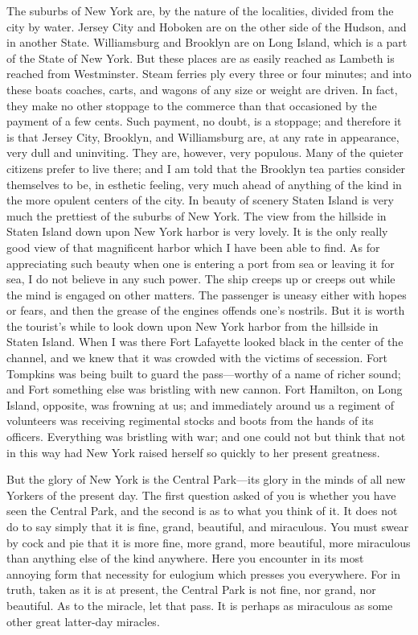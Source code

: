 The suburbs of New York are, by the nature of the localities,
divided from the city by water.  Jersey City and Hoboken are on the
other side of the Hudson, and in another State.  Williamsburg and
Brooklyn are on Long Island, which is a part of the State of New
York.  But these places are as easily reached as Lambeth is reached
from Westminster.  Steam ferries ply every three or four minutes;
and into these boats coaches, carts, and wagons of any size or
weight are driven.  In fact, they make no other stoppage to the
commerce than that occasioned by the payment of a few cents.  Such
payment, no doubt, is a stoppage; and therefore it is that Jersey
City, Brooklyn, and Williamsburg are, at any rate in appearance,
very dull and uninviting.  They are, however, very populous.  Many
of the quieter citizens prefer to live there; and I am told that
the Brooklyn tea parties consider themselves to be, in esthetic
feeling, very much ahead of anything of the kind in the more
opulent centers of the city.  In beauty of scenery Staten Island is
very much the prettiest of the suburbs of New York.  The view from
the hillside in Staten Island down upon New York harbor is very
lovely.  It is the only really good view of that magnificent harbor
which I have been able to find.  As for appreciating such beauty
when one is entering a port from sea or leaving it for sea, I do
not believe in any such power.  The ship creeps up or creeps out
while the mind is engaged on other matters.  The passenger is
uneasy either with hopes or fears, and then the grease of the
engines offends one's nostrils.  But it is worth the tourist's
while to look down upon New York harbor from the hillside in Staten
Island.  When I was there Fort Lafayette looked black in the center
of the channel, and we knew that it was crowded with the victims of
secession.  Fort Tompkins was being built to guard the pass---worthy
of a name of richer sound; and Fort something else was bristling
with new cannon.  Fort Hamilton, on Long Island, opposite, was
frowning at us; and immediately around us a regiment of volunteers
was receiving regimental stocks and boots from the hands of its
officers.  Everything was bristling with war; and one could not but
think that not in this way had New York raised herself so quickly
to her present greatness.

But the glory of New York is the Central Park---its glory in the
minds of all new Yorkers of the present day.  The first question
asked of you is whether you have seen the Central Park, and the
second is as to what you think of it.  It does not do to say simply
that it is fine, grand, beautiful, and miraculous.  You must swear
by cock and pie that it is more fine, more grand, more beautiful,
more miraculous than anything else of the kind anywhere.  Here you
encounter in its most annoying form that necessity for eulogium
which presses you everywhere.  For in truth, taken as it is at
present, the Central Park is not fine, nor grand, nor beautiful.
As to the miracle, let that pass.  It is perhaps as miraculous as
some other great latter-day miracles.

